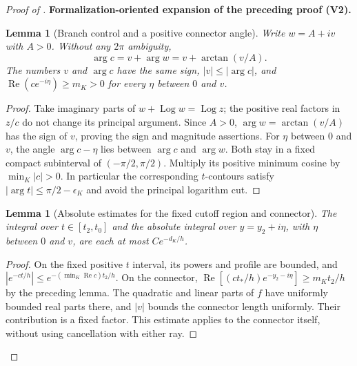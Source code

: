 \documentclass[11pt]{article}
\newtheorem{lemma}[theorem]{Lemma}
\newcommand{\formalisationparentid}{X}
\newenvironment{formalisationaddition}[1]{\par\medskip\begingroup\color{blue}\def\formalisationparentid{#1}\setcounter{formalizationsublemma}{0}\let\lemma\formalizationsublemma\let\endlemma\endformalizationsublemma
  \def\Eo{\mathcal E_h^\circ}\def\EE{\mathcal E_h}\def\phio{\phi_h^\circ}\def\phih{\phi_h}\def\Ho{H_h^{\rm atom}(v^\circ)}\def\Ha{H_h^{\rm atom}}\def\HL{H_h^{L}}\def\Dh{D_h}\def\Log{\operatorname{Log}}\def\ellh{\ell_h}\def\Gp{G_{p,h}}\def\Ast{A_{*,h}}\def\ahat{\widehat{\mathfrak a}_h}\def\ah{\mathfrak a_h}\def\rh{\widehat\rho_h}\def\deltah{\widehat\delta_h}\def\oldref##1{\textup{(##1)}}\def\interface##1{\par\noindent\textit{Analytical interface used here.} ##1\par}\def\finish{\par\noindent\textit{Conclusion of the formalization-oriented expansion.} }\par\noindent\textbf{Formalization-oriented expansion of the preceding proof (V2).}\par\smallskip
}{\par\endgroup\medskip
}
\newcommand{\Rea}{\operatorname{Re}}
\begin{document}
\begin{proof}[Proof of ]
\begin{formalisationaddition}{D-T6.4}
\begin{lemma}[Branch control and a positive connector angle]\label{sublemma:D6-4-branches}
Write $w=A+iv$ with $A>0$. Without any $2\pi$ ambiguity,
\[
 \arg c=v+\arg w=v+\arctan(v/A).
\]
The numbers $v$ and $\arg c$ have the same sign, $|v|\le|\arg c|$, and
$\Rea(ce^{-i\eta})\ge m_K>0$ for every $\eta$ between $0$ and $v$.
\end{lemma}
\begin{proof}
Take imaginary parts of $w+\Log w=\Log z$; the positive real factors
in $z/c$ do not change its principal argument. Since $A>0$,
$\arg w=\arctan(v/A)$ has the sign of $v$, proving the sign and
magnitude assertions. For $\eta$ between $0$ and $v$, the angle
$\arg c-\eta$ lies between $\arg c$ and $\arg w$.
Both stay in a fixed compact subinterval of $(-\pi/2,\pi/2)$.
Multiply its positive minimum cosine by $\min_K|c|>0$.
In particular the corresponding $t$-contours satisfy
$|\arg t|\le\pi/2-\epsilon_K$ and avoid the principal logarithm cut.
\end{proof}

\begin{lemma}[Absolute estimates for the fixed cutoff region and connector]\label{sublemma:D6-4-fixed-connectors}
The integral over $t\in[t_2,t_0]$ and the absolute integral over
$y=y_2+i\eta$, with $\eta$ between $0$ and $v$, are each at most
$Ce^{-d_K/h}$.
\end{lemma}
\begin{proof}
On the fixed positive $t$ interval, its powers and profile are bounded,
and $|e^{-ct/h}|\le e^{-(\min_K\Rea c)t_2/h}$.
On the connector,
$\Rea[(ct_*/h)e^{-y_2-i\eta}]\ge m_Kt_2/h$ by the preceding lemma.
The quadratic and linear parts of $f$ have uniformly bounded real
parts there, and $|v|$ bounds the connector length uniformly.
Their contribution is a fixed factor. This estimate applies to the
connector itself, without using cancellation with either ray.
\end{proof}


\end{formalisationaddition}
\end{proof}
\end{document}
